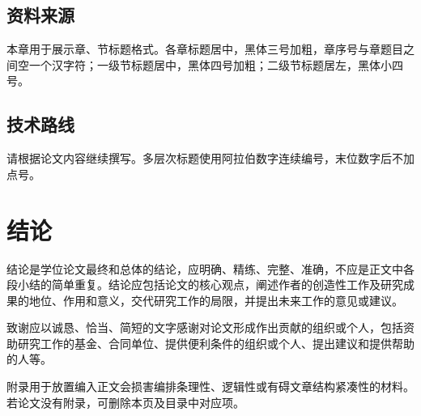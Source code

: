 \documentclass{cugthesis}
\begin{document}
\section{资料来源}

本章用于展示章、节标题格式。各章标题居中，黑体三号加粗，章序号与章题目之间空一个汉字符；一级节标题居中，黑体四号加粗；二级节标题居左，黑体小四号。

\section{技术路线}

请根据论文内容继续撰写。多层次标题使用阿拉伯数字连续编号，末位数字后不加点号。

\chapter{结论}

结论是学位论文最终和总体的结论，应明确、精练、完整、准确，不应是正文中各段小结的简单重复。结论应包括论文的核心观点，阐述作者的创造性工作及研究成果的地位、作用和意义，交代研究工作的局限，并提出未来工作的意见或建议。

\begin{CUGacknowledgements}
致谢应以诚恳、恰当、简短的文字感谢对论文形成作出贡献的组织或个人，包括资助研究工作的基金、合同单位、提供便利条件的组织或个人、提出建议和提供帮助的人等。
\end{CUGacknowledgements}

\makeCUGbibliography

\CUGappendix

附录用于放置编入正文会损害编排条理性、逻辑性或有碍文章结构紧凑性的材料。若论文没有附录，可删除本页及目录中对应项。
\end{document}
